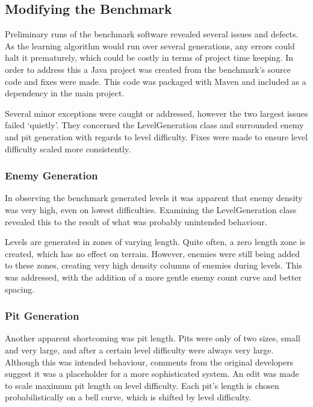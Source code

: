 \subsection{Modifying the Benchmark}
\label{subsec:enginemod}

Preliminary runs of the benchmark software revealed several issues and defects. As the learning algorithm would run over several generations, any errors could halt it prematurely, which could be costly in terms of project time keeping. In order to address this a Java project was created from the benchmark's source code and fixes were made. This code was packaged with Maven and included as a dependency in the main project.

Several minor exceptions were caught or addressed, however the two largest issues failed `quietly'. They concerned the LevelGeneration class and surrounded enemy and pit generation with regards to level difficulty. Fixes were made to ensure level difficulty scaled more consistently.

\subsubsection{Enemy Generation}

In observing the benchmark generated levels it was apparent that enemy density was very high, even on lowest difficulties. Examining the LevelGeneration class revealed this to the result of what was probably unintended behaviour. 

Levels are generated in zones of varying length. Quite often, a zero length zone is created, which has no effect on terrain. However, enemies were still being added to these zones, creating very high density columns of enemies during levels. This was addressed, with the addition of a more gentle enemy count curve and better spacing.

\subsubsection{Pit Generation}

Another apparent shortcoming was pit length. Pits were only of two sizes, small and very large, and after a certain level difficulty were always very large. Although this was intended behaviour, comments from the original developers suggest it was a placeholder for a more sophisticated system. An edit was made to scale maximum pit length on level difficulty. Each pit's length is chosen probabilistically on a bell curve, which is shifted by level difficulty.



